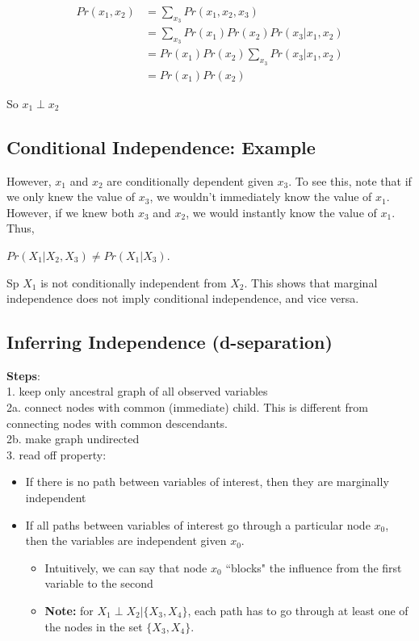 \documentclass[12pt]{article}
\begin{document}
\[ 
	\begin{aligned}
		Pr(x_1, x_2) &= \sum_{x_3} Pr(x_1, x_2, x_3)\\
								 &= \sum_{x_3} Pr(x_1)Pr(x_2)Pr(x_3|x_1, x_2)\\
								 &= Pr(x_1)Pr(x_2) \sum_{x_3} Pr(x_3|x_1, x_2)\\
								 &= Pr(x_1)Pr(x_2)
	\end{aligned}
\]

So $x_1 \perp x_2$

\subsection{Conditional Independence: Example}

However, $x_1$ and $x_2$ are conditionally dependent given $x_3$. To see this, note that if we only knew the value of $x_3$, we wouldn't immediately know the value of $x_1$. However, if we knew both $x_3$ and $x_2$, we would instantly know the value of $x_1$. Thus,

$Pr(X_1 | X_2, X_3) \ne Pr(X_1 | X_3)$.

Sp $X_1$ is not conditionally independent from $X_2$. This shows that marginal independence does not imply conditional independence, and vice versa.

\subsection{Inferring Independence (d-separation)} \label{sub:34.8}

\textbf{Steps}:\\
1. keep only ancestral graph of all observed variables\\
2a. connect nodes with common (immediate) child. This is different from connecting nodes with common descendants.\\
2b. make graph undirected\\
3. read off property:
\begin{itemize}
	\item If there is no path between variables of interest, then they are marginally independent
	\item If all paths between variables of interest go through a particular node $x_0$, then the variables are independent given $x_0$.
		\begin{itemize}
			\item Intuitively, we can say that node $x_0$ ``blocks" the influence from the first variable to the second
			\item \textbf{Note:} for $X_1 \perp X_2 | \{ X_3, X_4 \}$, each path has to go through at least one of the nodes in the set $\{ X_3, X_4 \}$.
		\end{itemize}
\end{itemize}
\end{document}
